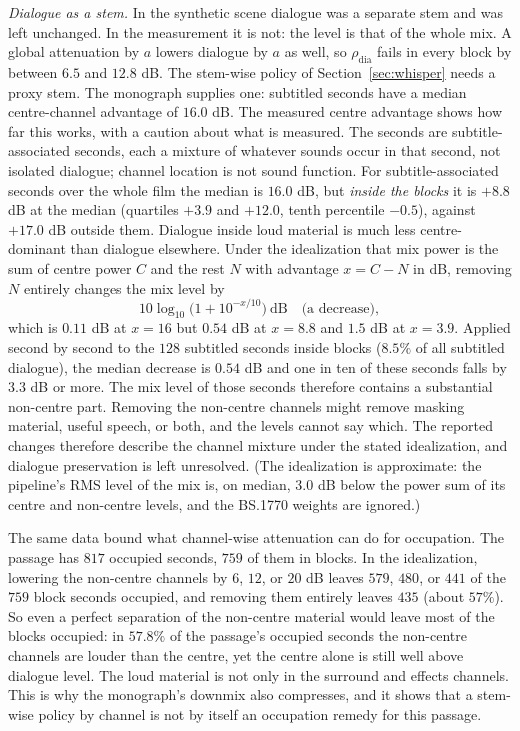 \emph{Dialogue as a stem.} In the synthetic scene dialogue was a separate stem and was left unchanged. In the measurement it is not: the level is that of the whole mix. A global attenuation by $a$ lowers dialogue by $a$ as well, so $\rho_{\mathrm{dia}}$ fails in every block by between $6.5$ and $12.8$ dB. The stem-wise policy of Section~\ref{sec:whisper} needs a proxy stem. The monograph supplies one: subtitled seconds have a median centre-channel advantage of $16.0$ dB. The measured centre advantage shows how far this works, with a caution about what is measured. The seconds are subtitle-associated seconds, each a mixture of whatever sounds occur in that second, not isolated dialogue; channel location is not sound function. For subtitle-associated seconds over the whole film the median is $16.0$ dB, but \emph{inside the blocks} it is $+8.8$ dB at the median (quartiles $+3.9$ and $+12.0$, tenth percentile $-0.5$), against $+17.0$ dB outside them. Dialogue inside loud material is much less centre-dominant than dialogue elsewhere. Under the idealization that mix power is the sum of centre power $C$ and the rest $N$ with advantage $x=C-N$ in dB, removing $N$ entirely changes the mix level by
\[
10\log_{10}\bigl(1+10^{-x/10}\bigr)\ \mathrm{dB}\quad\text{(a decrease)},
\]
which is $0.11$ dB at $x=16$ but $0.54$ dB at $x=8.8$ and $1.5$ dB at $x=3.9$. Applied second by second to the $128$ subtitled seconds inside blocks ($8.5\%$ of all subtitled dialogue), the median decrease is $0.54$ dB and one in ten of these seconds falls by $3.3$ dB or more. The mix level of those seconds therefore contains a substantial non-centre part. Removing the non-centre channels might remove masking material, useful speech, or both, and the levels cannot say which. The reported changes therefore describe the channel mixture under the stated idealization, and dialogue preservation is left unresolved. (The idealization is approximate: the pipeline's RMS level of the mix is, on median, $3.0$ dB below the power sum of its centre and non-centre levels, and the BS.1770 weights are ignored.)

The same data bound what channel-wise attenuation can do for occupation. The passage has $817$ occupied seconds, $759$ of them in blocks. In the idealization, lowering the non-centre channels by $6$, $12$, or $20$ dB leaves $579$, $480$, or $441$ of the $759$ block seconds occupied, and removing them entirely leaves $435$ (about $57\%$). So even a perfect separation of the non-centre material would leave most of the blocks occupied: in $57.8\%$ of the passage's occupied seconds the non-centre channels are louder than the centre, yet the centre alone is still well above dialogue level. The loud material is not only in the surround and effects channels. This is why the monograph's downmix also compresses, and it shows that a stem-wise policy by channel is not by itself an occupation remedy for this passage.

